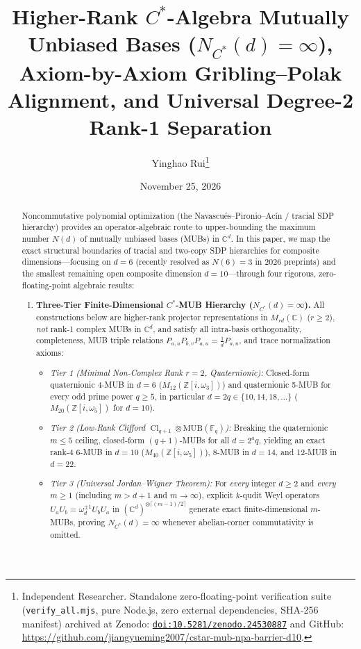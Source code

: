 \documentclass[11pt,a4paper]{article}
\title{\textbf{Higher-Rank $C^*$-Algebra Mutually Unbiased Bases ($N_{C^*}(d) = \infty$), Axiom-by-Axiom Gribling--Polak Alignment, and Universal Degree-2 Rank-1 Separation}}
\author{
  Yinghao Rui\thanks{Independent Researcher. Standalone zero-floating-point verification suite (\texttt{verify\_all.mjs}, pure Node.js, zero external dependencies, SHA-256 manifest) archived at Zenodo: \href{https://doi.org/10.5281/zenodo.24530887}{\texttt{doi:10.5281/zenodo.24530887}} and GitHub: \url{https://github.com/jiangyueming2007/cstar-mub-npa-barrier-d10}.}
}
\date{November 25, 2026}
\theoremstyle{definition}
\newcommand{\C}{\mathbb{C}}
\newcommand{\Z}{\mathbb{Z}}
\newcommand{\F}{\mathbb{F}}
\newcommand{\Cl}{\operatorname{Cl}}
\begin{document}
\maketitle

\begin{abstract}
Noncommutative polynomial optimization (the Navascu\'es--Pironio--Ac\'in / tracial SDP hierarchy) provides an operator-algebraic route to upper-bounding the maximum number $N(d)$ of mutually unbiased bases (MUBs) in $\C^d$. In this paper, we map the exact structural boundaries of tracial and two-copy SDP hierarchies for composite dimensions---focusing on $d=6$ (recently resolved as $N(6)=3$ in 2026 preprints) and the smallest remaining open composite dimension $d=10$---through four rigorous, zero-floating-point algebraic results:
\begin{enumerate}
  \item \textbf{Three-Tier Finite-Dimensional $C^*$-MUB Hierarchy ($N_{C^*}(d) = \infty$).} All constructions below are higher-rank projector representations in $M_{rd}(\C)$ ($r \ge 2$), \emph{not} rank-1 complex MUBs in $\C^d$, and satisfy all intra-basis orthogonality, completeness, MUB triple relations $P_{a,u} P_{b,v} P_{a,u} = \frac{1}{d} P_{a,u}$, and trace normalization axioms:
  \begin{itemize}
    \item \emph{Tier 1 (Minimal Non-Complex Rank $r=2$, Quaternionic):} Closed-form quaternionic 4-MUB in $d=6$ ($M_{12}(\Z[i,\omega_3])$) and quaternionic 5-MUB for every odd prime power $q \ge 5$, in particular $d = 2q \in \{10, 14, 18, \dots\}$ ($M_{20}(\Z[i,\omega_5])$ for $d=10$).
    \item \emph{Tier 2 (Low-Rank Clifford $\Cl_{q+1} \otimes \mathrm{MUB}(\F_q)$):} Breaking the quaternionic $m \le 5$ ceiling, closed-form $(q+1)$-MUBs for all $d = 2^a q$, yielding an exact rank-4 6-MUB in $d=10$ ($M_{40}(\Z[i,\omega_5])$), 8-MUB in $d=14$, and 12-MUB in $d=22$.
    \item \emph{Tier 3 (Universal Jordan--Wigner Theorem):} For \emph{every} integer $d \ge 2$ and \emph{every} $m \ge 1$ (including $m > d+1$ and $m \to \infty$), explicit $k$-qudit Weyl operators $U_a U_b = \omega_d^{\pm 1} U_b U_a$ in $(\C^d)^{\otimes \lceil (m-1)/2 \rceil}$ generate exact finite-dimensional $m$-MUBs, proving $N_{C^*}(d) = \infty$ whenever abelian-corner commutativity is omitted.
  \end{itemize}

\end{enumerate}
\end{abstract}
\end{document}
